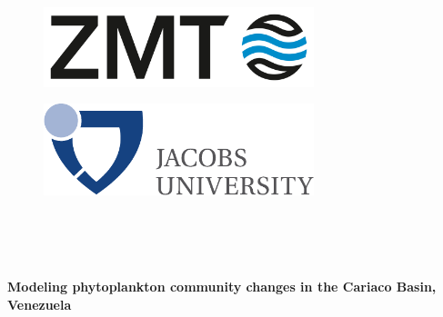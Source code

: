 \begin{titlepage}
\begin{center}

\begin{figure}[ht]
\begin{minipage}[b]{0.5\linewidth}
\centering
\includegraphics[width=0.7\textwidth]{./0-titel/ZMT_Logo_BILDMARKE_rgb_ENG.png}\\ 
\end{minipage}
\hspace{0.5cm}
\begin{minipage}[b]{0.5\linewidth}
\centering
\includegraphics[width=0.7\textwidth]{./0-titel/jacobs_big.pdf}\\
\end{minipage}
\end{figure}

\vspace{1cm}

\\[1.cm]

\\[1.5cm]

\vspace{2cm}

\\[0.5 cm]


{ \Huge \bfseries Modeling phytoplankton community changes in the Cariaco Basin, Venezuela}\\[0.4cm]



\end{center}
\end{titlepage}
